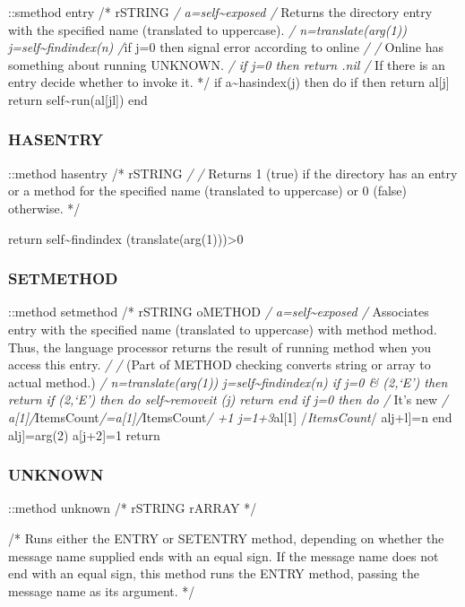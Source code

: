 ::smethod entry /* rSTRING \emph{/ a=self\textasciitilde exposed /}
Returns the directory entry with the specified name (translated to
uppercase). \emph{/ n=translate(arg(1))
j=self\textasciitilde findindex(n) /}if j=0 then signal error according
to online \emph{/ /} Online has something about running UNKNOWN. \emph{/
if j=0 then return .nil /} If there is an entry decide whether to invoke
it. */ if a\textasciitilde hasindex(j) then do if \al[j+2] then return
al{[}j{]} return self\textasciitilde run(al{[}jl{]}) end

\subsubsection{HASENTRY}\label{hasentry}

::method hasentry /* rSTRING \emph{/ /} Returns 1 (true) if the
directory has an entry or a method for the specified name (translated to
uppercase) or 0 (false) otherwise. */

return self\textasciitilde findindex (translate(arg(1)))\textgreater0

\subsubsection{SETMETHOD}\label{setmethod}

::method setmethod /* rSTRING oMETHOD \emph{/
a=self\textasciitilde exposed /} Associates entry with the specified
name (translated to uppercase) with method method. Thus, the language
processor returns the result of running method when you access this
entry. \emph{/ /} (Part of METHOD checking converts string or array to
actual method.) \emph{/ n=translate(arg(1))
j=self\textasciitilde findindex(n) if j=0 \& \arg(2,`E') then return if
\arg(2,`E') then do self\textasciitilde removeit (j) return end if j=0
then do /} It's new \emph{/
a{[}1{]}/}ItemsCount\emph{/=a{[}1{]}/}ItemsCount\emph{/ +1
j=1+3}al{[}1{]} /\emph{ItemsCount}/ alj+l{]}=n end alj{]}=arg(2)
a{[}j+2{]}=1 return

\subsubsection{UNKNOWN}\label{unknown}

::method unknown /* rSTRING rARRAY */

/* Runs either the ENTRY or SETENTRY method, depending on whether the
message name supplied ends with an equal sign. If the message name does
not end with an equal sign, this method runs the ENTRY method, passing
the message name as its argument. */

